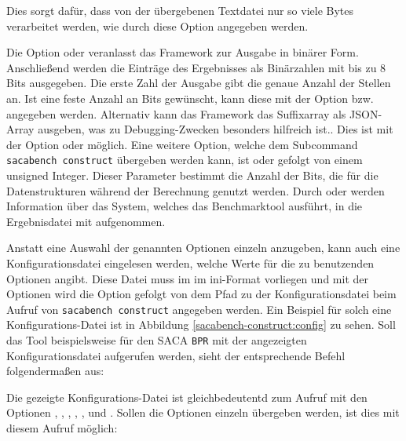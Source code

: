 Dies sorgt dafür, dass von der übergebenen Textdatei nur so viele Bytes verarbeitet werden, wie durch diese Option angegeben werden.\par
Die Option  oder  veranlasst das Framework zur Ausgabe in binärer Form.
Anschließend werden die Einträge des Ergebnisses als Binärzahlen mit bis zu 8 Bits ausgegeben.
Die erste Zahl der Ausgabe gibt die genaue Anzahl der Stellen an.
Ist eine feste Anzahl an Bits gewünscht, kann diese mit der Option  bzw.  angegeben werden.
Alternativ kann das Framework das Suffixarray als JSON-Array ausgeben, was zu Debugging-Zwecken besonders hilfreich ist.. 
Dies ist mit der Option  oder  möglich.
Eine weitere Option, welche dem Subcommand \texttt{sacabench construct} übergeben werden kann, ist  oder  gefolgt von einem unsigned Integer. 
Dieser Parameter bestimmt die Anzahl der Bits, die für die Datenstrukturen während der Berechnung genutzt werden.
Durch  oder  werden Information über das System, welches das Benchmarktool ausführt, in die Ergebnisdatei mit aufgenommen.\par
Anstatt eine Auswahl der genannten Optionen einzeln anzugeben, kann auch eine Konfigurationsdatei eingelesen werden, welche Werte für die zu benutzenden Optionen angibt.
Diese Datei muss im im ini-Format vorliegen und mit der Optionen wird die Option  gefolgt von dem Pfad zu der Konfigurationsdatei beim Aufruf von \texttt{sacabench construct} angegeben werden.
Ein Beispiel für solch eine Konfigurations-Datei ist in Abbildung \ref{sacabench-construct:config} zu sehen.
Soll das Tool beispielsweise für den SACA \texttt{BPR} mit der angezeigten Konfigurationsdatei aufgerufen werden, sieht der entsprechende Befehl folgendermaßen aus:


Die gezeigte Konfigurations-Datei ist gleichbedeutentd zum Aufruf mit den Optionen , , , , ,  und .
Sollen die Optionen einzeln übergeben werden, ist dies mit diesem Aufruf möglich:

\par

